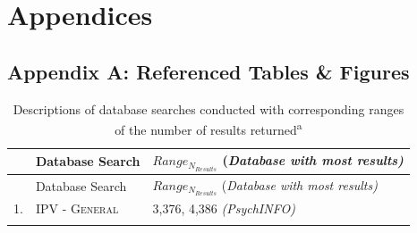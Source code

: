 \documentclass[11pt,]{tufte-book}
\begin{document}
\part{Appendices}

\chapter{Appendix A: Referenced Tables \&
Figures}\label{appendix-a-referenced-tables-figures}

\begin{longtable}[]{@{}lll@{}}
\caption{Descriptions of database searches conducted with corresponding
ranges of the number of results returned\textsuperscript{a}
\label{tbl:dbsrch}}\tabularnewline
\toprule
\begin{minipage}[b]{0.03\columnwidth}\raggedright\strut
\strut
\end{minipage} & \begin{minipage}[b]{0.44\columnwidth}\raggedright\strut
Database Search\strut
\end{minipage} & \begin{minipage}[b]{0.45\columnwidth}\raggedright\strut
\footnotesize{$Range_{N_{Results}}$}
(\textit{\scriptsize{Database with most results})}\strut
\end{minipage}\tabularnewline
\midrule
\endfirsthead
\toprule
\begin{minipage}[b]{0.03\columnwidth}\raggedright\strut
\strut
\end{minipage} & \begin{minipage}[b]{0.44\columnwidth}\raggedright\strut
Database Search\strut
\end{minipage} & \begin{minipage}[b]{0.45\columnwidth}\raggedright\strut
\footnotesize{$Range_{N_{Results}}$}
(\textit{\scriptsize{Database with most results})}\strut
\end{minipage}\tabularnewline
\midrule
\endhead
\begin{minipage}[t]{0.03\columnwidth}\raggedright\strut
1.\strut
\end{minipage} & \begin{minipage}[t]{0.44\columnwidth}\raggedright\strut
\textsc{IPV - General}\strut
\end{minipage} & \begin{minipage}[t]{0.45\columnwidth}\raggedright\strut
3,376, 4,386 \textit{\footnotesize{(PsychINFO)}}\strut
\end{minipage}\tabularnewline
\begin{minipage}[t]{0.03\columnwidth}\raggedright\strut

\end{minipage}
\end{longtable}
\end{document}
